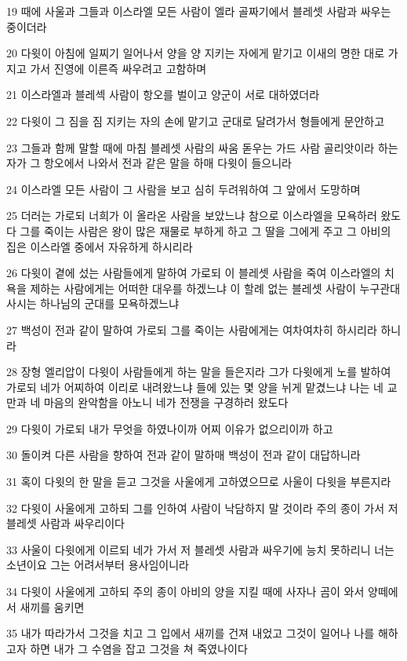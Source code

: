 \par 19 때에 사울과 그들과 이스라엘 모든 사람이 엘라 골짜기에서 블레셋 사람과 싸우는 중이더라
\par 20 다윗이 아침에 일찌기 일어나서 양을 양 지키는 자에게 맡기고 이새의 명한 대로 가지고 가서 진영에 이른즉 싸우려고 고함하며
\par 21 이스라엘과 블레섹 사람이 항오를 벌이고 양군이 서로 대하였더라
\par 22 다윗이 그 짐을 짐 지키는 자의 손에 맡기고 군대로 달려가서 형들에게 문안하고
\par 23 그들과 함께 말할 때에 마침 블레셋 사람의 싸움 돋우는 가드 사람 골리앗이라 하는 자가 그 항오에서 나와서 전과 같은 말을 하매 다윗이 들으니라
\par 24 이스라엘 모든 사람이 그 사람을 보고 심히 두려워하여 그 앞에서 도망하며
\par 25 더러는 가로되 너희가 이 올라온 사람을 보았느냐 참으로 이스라엘을 모욕하러 왔도다 그를 죽이는 사람은 왕이 많은 재물로 부하게 하고 그 딸을 그에게 주고 그 아비의 집은 이스라엘 중에서 자유하게 하시리라
\par 26 다윗이 곁에 섰는 사람들에게 말하여 가로되 이 블레셋 사람을 죽여 이스라엘의 치욕을 제하는 사람에게는 어떠한 대우를 하겠느냐 이 할례 없는 블레셋 사람이 누구관대 사시는 하나님의 군대를 모욕하겠느냐
\par 27 백성이 전과 같이 말하여 가로되 그를 죽이는 사람에게는 여차여차히 하시리라 하니라
\par 28 장형 엘리압이 다윗이 사람들에게 하는 말을 들은지라 그가 다윗에게 노를 발하여 가로되 네가 어찌하여 이리로 내려왔느냐 들에 있는 몇 양을 뉘게 맡겼느냐 나는 네 교만과 네 마음의 완악함을 아노니 네가 전쟁을 구경하러 왔도다
\par 29 다윗이 가로되 내가 무엇을 하였나이까 어찌 이유가 없으리이까 하고
\par 30 돌이켜 다른 사람을 향하여 전과 같이 말하매 백성이 전과 같이 대답하니라
\par 31 혹이 다윗의 한 말을 듣고 그것을 사울에게 고하였으므로 사울이 다윗을 부른지라
\par 32 다윗이 사울에게 고하되 그를 인하여 사람이 낙담하지 말 것이라 주의 종이 가서 저 블레셋 사람과 싸우리이다
\par 33 사울이 다윗에게 이르되 네가 가서 저 블레셋 사람과 싸우기에 능치 못하리니 너는 소년이요 그는 어려서부터 용사임이니라
\par 34 다윗이 사울에게 고하되 주의 종이 아비의 양을 지킬 때에 사자나 곰이 와서 양떼에서 새끼를 움키면
\par 35 내가 따라가서 그것을 치고 그 입에서 새끼를 건져 내었고 그것이 일어나 나를 해하고자 하면 내가 그 수염을 잡고 그것을 쳐 죽였나이다
